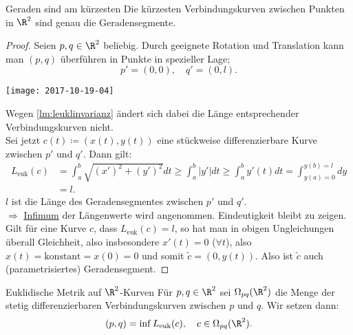 \begin{lemma}{Geraden sind am kürzesten}
  \label{lemma:geradenkurz}
  Die kürzesten Verbindungskurven zwischen Punkten in $ \R^2 $ sind genau die Geradensegmente. \\
  \begin{proof}
    Seien $ p, q \in \R^2 $ beliebig. Durch geeignete Rotation und Translation kann man $ (p,q) $ überführen in Punkte in spezieller Lage;
    \begin{equation*}
      p' = (0,0), \quad q' = (0,l)\text{.}
    \end{equation*}
    \begin{marginfigure}
      \texttt{[image: 2017-10-19-04]}
      \caption{Verschiebung von $ p $ und $ q $ auf $ p' $ und $ q' $.}
    \end{marginfigure}
    Wegen \autoref{lm:leuklinvarianz} ändert sich dabei die Länge entsprechender Verbindungskurven nicht. \\
    Sei jetzt $ c(t) \coloneqq (x(t),y(t)) $ eine stückweise differenzierbare Kurve zwischen $ p' $ und $ q' $. Dann gilt:
    \begin{align*}
      L_\text{euk}(c) &= \int_a^b\sqrt{(x')^2+(y')^2}dt \geq \int_a^b\vert y' \vert dt \geq \int_a^by'(t)dt = \int_{y(a) = 0}^{y(b) = l} dy \\
       &= l\text{.}
    \end{align*}
    $ l $ ist die Länge des Geradensegmentes zwischen $ p' $ und $ q' $. \\
    $ \Rightarrow $ \underline{Infimum} der Längenwerte wird angenommen. Eindeutigkeit bleibt zu zeigen. \\
    Gilt für eine Kurve $ c $, dass $ L_\text{euk}(c) = l $, so hat man in obigen Ungleichungen überall Gleichheit, also insbesondere $ x'(t) = 0 $ ($ \forall t $), also $ x(t) = \text{konstant} = x(0) = 0 $ und somit $ \widetilde{c} = (0,y(t)) $. Also ist $ \widetilde{c} $ auch (parametrisiertes) Geradensegment.
  \end{proof}
\end{lemma}

\begin{definition}{Euklidische Metrik auf $ \R^2 $-Kurven}
  Für $ p,q \in \R^2 $ sei $ \Omega_{pq}(\R^2) $ die Menge der stetig differenzierbaren Verbindungskurven zwischen $ p $ und $ q $. Wir setzen dann:
  \begin{equation*}
    (p,q) = \inf L_\text{euk}(c), \quad c \in \Omega_{pq}(\R^2)\text{.}
  \end{equation*}
\end{definition}

